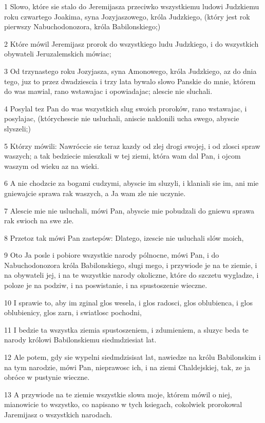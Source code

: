 \par 1 Slowo, które sie stalo do Jeremijasza przeciwko wszystkiemu ludowi Judzkiemu roku czwartego Joakima, syna Jozyjaszowego, króla Judzkiego, (który jest rok pierwszy Nabuchodonozora, króla Babilonskiego;)
\par 2 Które mówil Jeremijasz prorok do wszystkiego ludu Judzkiego, i do wszystkich obywateli Jeruzalemskich mówiac;
\par 3 Od trzynastego roku Jozyjasza, syna Amonowego, króla Judzkiego, az do dnia tego, juz to przez dwadziescia i trzy lata bywalo slowo Panskie do mnie, którem do was mawial, rano wstawajac i opowiadajac; alescie nie sluchali.
\par 4 Posylal tez Pan do was wszystkich slug swoich proroków, rano wstawajac, i posylajac, (którychescie nie usluchali, aniscie naklonili ucha swego, abyscie slyszeli;)
\par 5 Którzy mówili: Nawróccie sie teraz kazdy od zlej drogi swojej, i od zlosci spraw waszych; a tak bedziecie mieszkali w tej ziemi, która wam dal Pan, i ojcom waszym od wieku az na wieki.
\par 6 A nie chodzcie za bogami cudzymi, abyscie im sluzyli, i klaniali sie im, ani mie gniewajcie sprawa rak waszych, a Ja wam zle nie uczynie.
\par 7 Alescie mie nie usluchali, mówi Pan, abyscie mie pobudzali do gniewu sprawa rak swioch na swe zle.
\par 8 Przetoz tak mówi Pan zastepów: Dlatego, izescie nie usluchali slów moich,
\par 9 Oto Ja posle i pobiore wszystkie narody pólnocne, mówi Pan, i do Nabuchodonozora króla Babilonskiego, slugi mego, i przywiode je na te ziemie, i na obywateli jej, i na te wszystkie narody okoliczne, które do szczetu wygladze, i poloze je na podziw, i na poswistanie, i na spustoszenie wieczne.
\par 10 I sprawie to, aby im zginal glos wesela, i glos radosci, glos oblubienca, i glos oblubienicy, glos zarn, i swiatlosc pochodni,
\par 11 I bedzie ta wszystka ziemia spustoszeniem, i zdumieniem, a sluzyc beda te narody królowi Babilonskiemu siedmdziesiat lat.
\par 12 Ale potem, gdy sie wypelni siedmdzisisat lat, nawiedze na królu Babilonskim i na tym narodzie, mówi Pan, nieprawosc ich, i na ziemi Chaldejskiej, tak, ze ja obróce w pustynie wieczne.
\par 13 A przywiode na te ziemie wszystkie slowa moje, którem mówil o niej, mianowicie to wszystko, co napisano w tych ksiegach, cokolwiek prorokowal Jaremijasz o wszystkich narodach.
